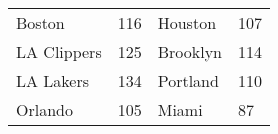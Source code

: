 \begin{tabular}{llll}
\toprule
     Boston & 116 &  Houston & 107 \\
LA Clippers & 125 & Brooklyn & 114 \\
  LA Lakers & 134 & Portland & 110 \\
    Orlando & 105 &    Miami &  87 \\
\bottomrule
\end{tabular}
